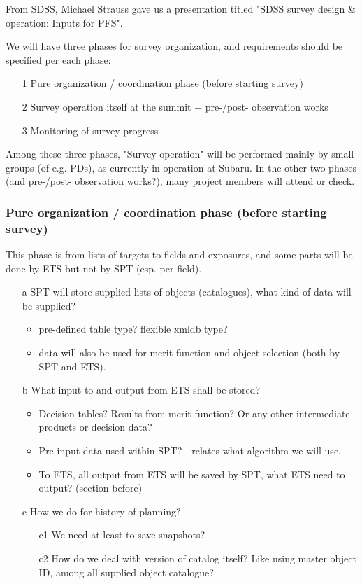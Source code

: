\documentclass[a4paper,notitlepage]{article}
\begin{document}
From SDSS, Michael Strauss gave us a presentation titled "SDSS survey design 
\& operation: Inputs for PFS". 

We will have three phases for survey organization, and requirements should be 
specified per each phase: 
\begin{enumerate}
  \item[1] Pure organization / coordination phase (before starting survey)
  \item[2] Survey operation itself at the summit + pre-/post- observation works
  \item[3] Monitoring of survey progress
\end{enumerate}
Among these three phases, "Survey operation" will be performed mainly by small 
groups (of e.g. PDs), as currently in operation at Subaru. In the other two 
phases (and pre-/post- observation works?), many project members will attend 
or check.



\subsubsection{Pure organization / coordination phase (before starting survey)}

This phase is from lists of targets to fields and exposures, 
and some parts will be done by ETS but not by SPT (esp. per field). 

\begin{enumerate}
  \item[a] SPT will store supplied lists of objects (catalogues), what kind 
    of data will be supplied? 
    \begin{itemize}
      \item pre-defined table type? flexible xmldb type?
      \item data will also be used for merit function and object selection 
        (both by SPT and ETS).
    \end{itemize}
  \item[b] What input to and output from ETS shall be stored?
    \begin{itemize}
      \item Decision tables? Results from merit function? Or any other 
        intermediate products or decision data?
      \item Pre-input data used within SPT? - relates what algorithm we will use.
      \item To ETS, all output from ETS will be saved by SPT, what ETS need 
        to output? (section before)
    \end{itemize}
  \item[c] How we do for history of planning?
    \begin{enumerate}
      \item[c1] We need at least to save snapshots?
      \item[c2] How do we deal with version of catalog itself? Like using master 
        object ID, among all supplied object catalogue?
    \end{enumerate}
\end{enumerate}
\end{document}
